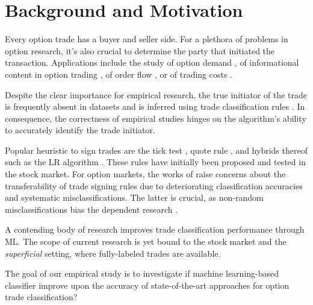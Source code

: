 

\section{Background and Motivation}

Every option trade has a buyer and seller side. For a plethora of problems in option research, it’s also crucial to determine the party that initiated the transaction. Applications include the study of option demand \autocite[][]{garleanuDemandBasedOptionPricing2009}, of informational content in option trading \autocites[][]{huDoesOptionTrading2014}[][]{panInformationOptionVolume2006}[][]{caoInformationalContentOption2005}, of order flow \autocite[][]{muravyevOrderFlowExpected2016}, or of trading costs \autocite[][]{muravyevOptionsTradingCosts2020}. 

Despite the clear importance for empirical research, the true initiator of the trade is frequently absent in datasets and is inferred using trade classification rules \autocite[][]{easleyOptionVolumeStock1998}. In consequence, the correctness of empirical studies hinges on the algorithm's ability to accurately identify the trade initiator.

Popular heuristic to sign trades are the tick test \autocite[][]{hasbrouckTradesQuotesInventories1988}, quote rule \autocite[][]{harrisDayEndTransactionPrice1989}, and hybrids thereof such as the \gls{LR} algorithm \autocite[][]{leeInferringTradeDirection1991}. These rules have initially been proposed and tested in the stock market. For option markets, the works of \textcites[][]{savickasInferringDirectionOption2003}[][]{grauerOptionTradeClassification2022} raise concerns about the transferability of trade signing rules due to deteriorating classification accuracies and systematic misclassifications. The latter is crucial, as non-random misclassifications bias the dependent research \autocites[][]{odders-whiteOccurrenceConsequencesInaccurate2000}[][]{theissenTestAccuracyLee2001}.

A contending body of research \autocites{blazejewskiLocalNonParametricModel2005}{rosenthalModelingTradeDirection2012}{ronenMachineLearningTrade2022} improves trade classification performance through \gls{ML}. The scope of current research is yet bound to the stock market and the \textit{superficial} setting, where fully-labeled trades are available. 

The goal of our empirical study is to investigate if machine learning-based classifier improve upon the accuracy of state-of-the-art approaches for option trade classification?


